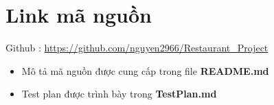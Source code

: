 \section{Link mã nguồn}
Github : \href{https://github.com/nguyen2966/Restaurant_Project}{https://github.com/nguyen2966/Restaurant\_Project}

\begin{itemize}
  \item Mô tả mã nguồn được cung cấp trong file \textbf{README.md}
  \item Test plan được trình bày trong \textbf{TestPlan.md}
\end{itemize}
